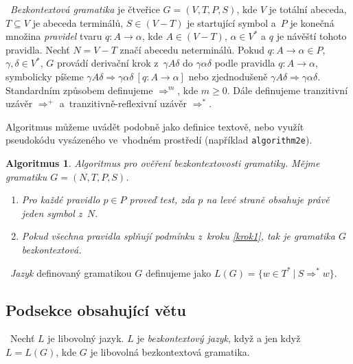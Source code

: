 \documentclass[a4paper,11pt,twocolumn,titlepage]{article}[11.3.2016]
\begin{document}
\begin{definicia} \label{definicia1.1} \  \textsl{Bezkontextová gramatika} \textup{je čtveřice $G=(V,T,P,S)$, kde $V$ je totální abeceda, $T \subseteq V$ je abeceda terminálů, $S \in (V-T)$ je startující symbol a~$P$ je konečná množina \emph{pravidel}
tvaru $q\colon A \rightarrow \alpha$, kde $A \in (V - T) $, $\alpha \in V^*$ a $q$ je návěští tohoto pravidla. Nechť $N = V - T$ značí abecedu neterminálů.
Pokud $q\colon A \rightarrow \alpha \in P$, $\gamma, \delta \in V^*$, $G$ provádí derivační krok z~$\gamma A \delta$ do $\gamma \alpha \delta$ podle pravidla $q\colon A \rightarrow \alpha$, symbolicky píšeme $\gamma A \delta \Rightarrow \gamma \alpha \delta \ [q\colon A \rightarrow \alpha]$ nebo zjednodušeně $\gamma A \delta \Rightarrow \gamma \alpha \delta$. Standardním způsobem definujeme $\Rightarrow^m$, kde $m \geq 0 $. Dále definujeme tranzitivní uzávěr $\Rightarrow^+$ a~tranzitivně-reflexivní uzávěr $\Rightarrow^*$.}
\end{definicia}

Algoritmus můžeme uvádět podobně jako definice textově, nebo využít pseudokódu vysázeného ve~vhodném prostředí (například \verb|algorithm2e|).

\newtheorem{algoritmus}[definicia]{Algoritmus}

\begin{algoritmus}
Algoritmus pro ověření bezkontextovosti gramatiky. Mějme gramatiku $G = (N, T, P, S)$.
\begin{enumerate}
\item \label{krok1} Pro každé pravidlo $p \in P$ proveď test, zda $p$ na levé straně obsahuje právě jeden symbol z~$N$.
\item Pokud všechna pravidla splňují podmínku z~kroku \ref{krok1}, tak je gramatika $G$ bezkontextová.
\end{enumerate}
\end{algoritmus} 

\begin{definicia}\  \textsl{Jazyk} \textup{definovaný gramatikou $G$ definujeme jako $L(G) = \{w \in T^*\ |\ S \Rightarrow^* w \}$.}
\end{definicia}

\subsection{Podsekce obsahující větu}

\begin{definicia}\  \textup{Nechť $L$ je libovolný jazyk. $L$ je \textsl{bezkontextový jazyk}, když a jen když $L = L(G)$, kde $G$ je libovolná bezkontextová gramatika.}
\end{definicia}
\end{document}

